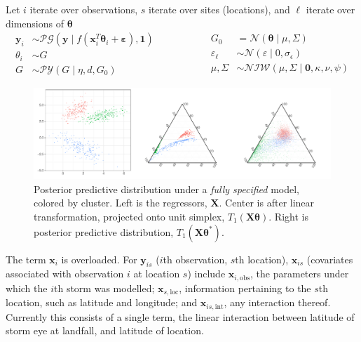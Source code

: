 Let $i$ iterate over observations, $s$ iterate over sites (locations), and $\ell$ iterate over 
    dimensions of $\bm{\theta}$
\begin{equation}
    \begin{aligned}
        \bm{y}_i &\sim \mathcal{PG}(\bm{y}\mid f(\bm{x}_i^T\bm{\theta}_i + \bm{\varepsilon}), \bm{1})\\
        \theta_i &\sim G\\
        G &\sim \mathcal{PY}(G\mid\eta, d, G_0)
    \end{aligned}
    ~\hspace{2cm}
    \begin{aligned}
        G_0 &= \mathcal{N}(\bm{\theta} \mid \mu, \Sigma)\\
        \varepsilon_{\ell} &\sim \mathcal{N}(\varepsilon \mid 0, \sigma_{\epsilon})\\
        \mu,\Sigma &\sim \mathcal{NIW}(\mu,\Sigma\mid \bm{0}, \kappa, \nu, \psi)
    \end{aligned}
\end{equation}

\begin{figure}[ht]
    \centering
    \caption{Posterior predictive distribution under a \emph{fully specified} model, colored 
        by cluster.  Left is the regressors, $\bm{X}$.  Center is after linear transformation, 
        projected onto unit simplex, $T_{1}(\bm{X}\bm{\theta})$.  Right is posterior predictive 
        distribution, $T_1(\bm{X}\bm{\theta}^*).$\label{fig:simreg}}
    \includegraphics[width = \textwidth]{plots/simulated_reg}
\end{figure}

The term $\bm{x}_i$ is overloaded.  For $\bm{y}_{is}$ ($i$th observation, $s$th location), 
    $\bm{x}_{is}$ (covariates associated with observation $i$ at location $s$) include 
    $\bm{x}_{i,\text{obs}}$, the parameters under which the $i$th storm 
    was modelled; $\bm{x}_{s,\text{loc}}$, information pertaining to the $s$th location, such
    as latitude and longitude; and $\bm{x}_{is,\text{int}}$, any interaction thereof.  Currently
    this consists of a single term, the linear interaction between latitude of storm eye at landfall, 
    and latitude of location.